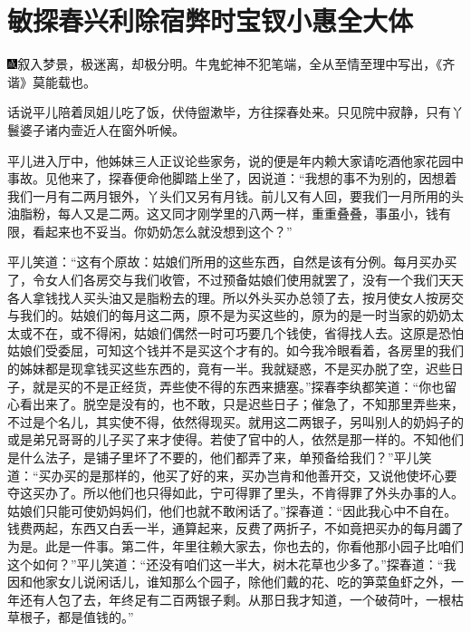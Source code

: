 

\chapter{敏探春兴利除宿弊\hspace{.5em}时宝钗小惠全大体}

{\includegraphics[width=3mm]{../Images/00005}叙入梦景，极迷离，却极分明。牛鬼蛇神不犯笔端，全从至情至理中写出，《齐谐》莫能载也。}

话说平儿陪着凤姐儿吃了饭，伏侍盥漱毕，方往探春处来。只见院中寂静，只有丫鬟婆子诸内壸近人在窗外听候。

平儿进入厅中，他姊妹三人正议论些家务，说的便是年内赖大家请吃酒他家花园中事故。见他来了，探春便命他脚踏上坐了，因说道：``我想的事不为别的，因想着我们一月有二两月银外，丫头们又另有月钱。前儿又有人回，要我们一月所用的头油脂粉，每人又是二两。这又同才刚学里的八两一样，重重叠叠，事虽小，钱有限，看起来也不妥当。你奶奶怎么就没想到这个？''

平儿笑道：``这有个原故：姑娘们所用的这些东西，自然是该有分例。每月买办买了，令女人们各房交与我们收管，不过预备姑娘们使用就罢了，没有一个我们天天各人拿钱找人买头油又是脂粉去的理。所以外头买办总领了去，按月使女人按房交与我们的。姑娘们的每月这二两，原不是为买这些的，原为的是一时当家的奶奶太太或不在，或不得闲，姑娘们偶然一时可巧要几个钱使，省得找人去。这原是恐怕姑娘们受委屈，可知这个钱并不是买这个才有的。如今我冷眼看着，各房里的我们的姊妹都是现拿钱买这些东西的，竟有一半。我就疑惑，不是买办脱了空，迟些日子，就是买的不是正经货，弄些使不得的东西来搪塞。''探春李纨都笑道：``你也留心看出来了。脱空是没有的，也不敢，只是迟些日子；催急了，不知那里弄些来，不过是个名儿，其实使不得，依然得现买。就用这二两银子，另叫别人的奶妈子的或是弟兄哥哥的儿子买了来才使得。若使了官中的人，依然是那一样的。不知他们是什么法子，是铺子里坏了不要的，他们都弄了来，单预备给我们？''平儿笑道：``买办买的是那样的，他买了好的来，买办岂肯和他善开交，又说他使坏心要夺这买办了。所以他们也只得如此，宁可得罪了里头，不肯得罪了外头办事的人。姑娘们只能可使奶妈妈们，他们也就不敢闲话了。''探春道：``因此我心中不自在。钱费两起，东西又白丢一半，通算起来，反费了两折子，不如竟把买办的每月蠲了为是。此是一件事。第二件，年里往赖大家去，你也去的，你看他那小园子比咱们这个如何？''平儿笑道：``还没有咱们这一半大，树木花草也少多了。''探春道：``我因和他家女儿说闲话儿，谁知那么个园子，除他们戴的花、吃的笋菜鱼虾之外，一年还有人包了去，年终足有二百两银子剩。从那日我才知道，一个破荷叶，一根枯草根子，都是值钱的。''


